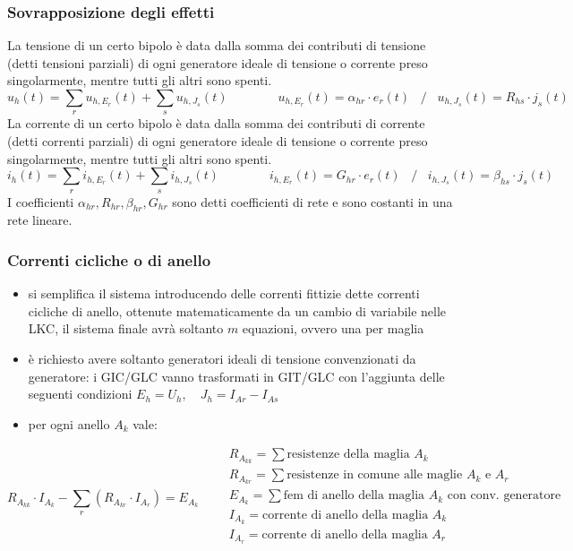 \documentclass[a4paper]{article}
\begin{document}
\subsubsection*{Sovrapposizione degli effetti}
La tensione di un certo bipolo è data dalla somma dei contributi di tensione (detti tensioni parziali) di ogni generatore ideale
di tensione o corrente preso singolarmente, mentre tutti gli altri sono spenti.
\[u_h(t) = \sum_r u_{h,E_r}(t) + \sum_s u_{h,J_s}(t) \qquad\qquad u_{h,E_r}(t) = \alpha_{hr} \cdot e_r(t) \;\;\; / \;\;\; u_{h,J_s}(t) = R_{hs} \cdot j_s(t)\]
La corrente di un certo bipolo è data dalla somma dei contributi di corrente (detti correnti parziali) di ogni generatore ideale
di tensione o corrente preso singolarmente, mentre tutti gli altri sono spenti.
\[i_h(t) = \sum_r i_{h,E_r}(t) + \sum_s i_{h,J_s}(t) \qquad\qquad i_{h,E_r}(t) = G_{hr} \cdot e_r(t) \;\;\; / \;\;\; i_{h,J_s}(t) = \beta_{hs} \cdot j_s(t) \]
I coefficienti \(\alpha_{hr}, R_{hr}, \beta_{hr}, G_{hr}\) sono detti coefficienti di rete e sono costanti in una rete lineare.

\subsubsection*{Correnti cicliche o di anello}
\begin{itemize}
	\item si semplifica il sistema introducendo delle correnti fittizie dette correnti cicliche di anello, ottenute matematicamente
	da un cambio di variabile nelle LKC, il sistema finale avrà soltanto \(m\) equazioni, ovvero una per maglia
	\item è richiesto avere soltanto generatori ideali di tensione convenzionati da generatore: i GIC/GLC vanno trasformati
	in GIT/GLC con l'aggiunta delle seguenti condizioni \(E_h = U_h, \quad J_h = I_{Ar} - I_{As}\)
	\item per ogni anello \(A_k\) vale:
\end{itemize}
\[R_{A_{kk}} \cdot I_{A_k} - \sum_r (R_{A_{kr}} \cdot I_{A_r}) = E_{A_k} \qquad
\begin{array}{l}
	R_{A_{kk}} = \sum \text{resistenze della maglia } A_k \\
	R_{A_{kr}} = \sum \text{resistenze in comune alle maglie } A_k \text{ e } A_r \\
	E_{A_k} = \sum \text{fem di anello della maglia } A_k \text{ con conv. generatore} \\
	I_{A_k} = \text{corrente di anello della maglia } A_k \\
	I_{A_r} = \text{corrente di anello della maglia } A_r \\
\end{array}\]
\end{document}
